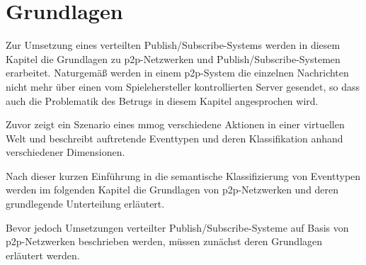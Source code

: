 \chapter{Grundlagen}
\label{chap:grundlagen}

Zur Umsetzung eines verteilten Publish/Subscribe-Systems werden in diesem Kapitel die Grundlagen zu \ac{p2p}-Netzwerken und Publish/Subscribe-Systemen erarbeitet. Naturgemäß werden in einem \ac{p2p}-System die einzelnen Nachrichten nicht mehr über einen vom Spielehersteller kontrollierten Server gesendet, so dass auch die Problematik des Betrugs in diesem Kapitel angesprochen wird.

Zuvor zeigt ein Szenario eines \ac{mmog} verschiedene Aktionen in einer virtuellen Welt und beschreibt auftretende Eventtypen und deren Klassifikation anhand verschiedener Dimensionen.



Nach dieser kurzen Einführung in die semantische Klassifizierung von Eventtypen werden im folgenden Kapitel die Grundlagen von \ac{p2p}-Netzwerken und deren grundlegende Unterteilung erläutert.







Bevor jedoch Umsetzungen verteilter Publish/Subscribe-Systeme auf Basis von \ac{p2p}-Netzwerken beschrieben werden, müssen zunächst deren Grundlagen erläutert werden.


